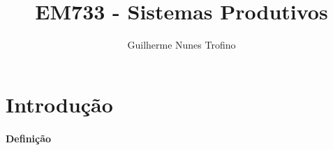 \documentclass{article}
\title{EM733 - Sistemas Produtivos}
\author{Guilherme Nunes Trofino}
\begin{document}
    \maketitle
\newpage

    \tableofcontents
\newpage

    \section{Introdução}
        \paragraph{Definição}
\end{document}
